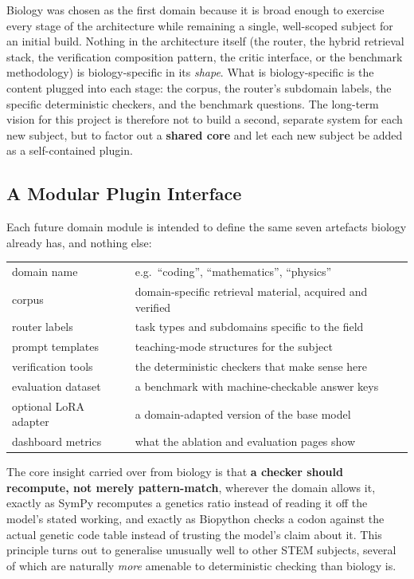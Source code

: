 Biology was chosen as the first domain because it is broad enough to
exercise every stage of the architecture while remaining a single,
well-scoped subject for an initial build. Nothing in the architecture
itself (the router, the hybrid retrieval stack, the verification
composition pattern, the critic interface, or the benchmark methodology)
is biology-specific in its \emph{shape}. What is biology-specific is the
content plugged into each stage: the corpus, the router's subdomain
labels, the specific deterministic checkers, and the benchmark questions.
The long-term vision for this project is therefore not to build a second,
separate system for each new subject, but to factor out a \textbf{shared
core} and let each new subject be added as a self-contained plugin.

\subsection{A Modular Plugin Interface}\label{5.4.1}

Each future domain module is intended to define the same seven artefacts
biology already has, and nothing else:

\begin{center}
\footnotesize\ttfamily
\begin{tabular}{@{}ll@{}}
domain name & e.g.\ ``coding'', ``mathematics'', ``physics'' \\
corpus & domain-specific retrieval material, acquired and verified \\
router labels & task types and subdomains specific to the field \\
prompt templates & teaching-mode structures for the subject \\
verification tools & the deterministic checkers that make sense here \\
evaluation dataset & a benchmark with machine-checkable answer keys \\
optional LoRA adapter & a domain-adapted version of the base model \\
dashboard metrics & what the ablation and evaluation pages show \\
\end{tabular}
\end{center}

The core insight carried over from biology is that \textbf{a checker
should recompute, not merely pattern-match}, wherever the domain allows
it, exactly as SymPy recomputes a genetics ratio instead of reading it
off the model's stated working, and exactly as Biopython checks a codon
against the actual genetic code table instead of trusting the model's
claim about it. This principle turns out to generalise unusually well to
other STEM subjects, several of which are naturally \emph{more}
amenable to deterministic checking than biology is.

